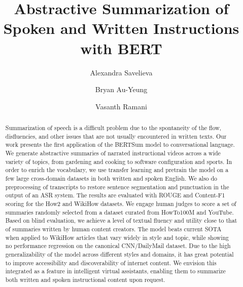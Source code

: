 \documentclass[sigconf]{acmart}
\begin{document}
\title{Abstractive Summarization of \\ Spoken and Written Instructions with BERT}

\author{Alexandra Savelieva}
 

\author{  Bryan Au-Yeung}
\authornotemark[1]



\author{Vasanth Ramani}
\authornotemark[1]
\authornotemark[2]
  

\renewcommand{\shortauthors}{Savelieva, Au-Yeung, Ramani}

\begin{abstract}

Summarization of speech is a difficult problem due to the spontaneity of the flow, disfluencies, and other issues that are not usually encountered in written texts. Our work presents the first application of the BERTSum model to conversational language. We generate abstractive summaries of narrated instructional videos across a wide variety of topics, from gardening and cooking to software configuration and sports. In order to enrich the vocabulary, we use transfer learning and pretrain the model on a few large cross-domain datasets in both written and spoken English. We also do preprocessing of transcripts to restore sentence segmentation and punctuation in the output of an ASR system. The results are evaluated with ROUGE and Content-F1 scoring for the How2 and WikiHow datasets. We engage human judges to score a set of summaries randomly selected from a dataset curated from  HowTo100M and YouTube. Based on blind evaluation, we achieve a level of textual fluency and utility close to that of summaries written by human content creators. The model beats current SOTA when applied to WikiHow articles that vary widely in style and topic, while showing no performance regression on the canonical CNN/DailyMail dataset.  Due to the high generalizability of the model across different styles and domains, it has great potential to improve accessibility and discoverability of internet content. We envision this integrated as a feature in intelligent virtual assistants, enabling them to summarize both written and spoken instructional content upon request.


\end{abstract}
\end{document}
